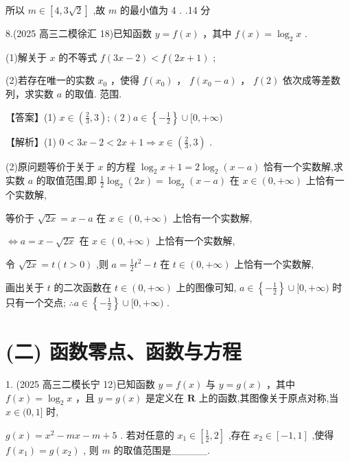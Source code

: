 \documentclass[10pt]{article}
\begin{document}
所以 \(m \in  \left\lbrack  {4,3\sqrt{2}}\right\rbrack\) ,故 \(m\) 的最小值为 4 . .14 分

8.(2025 高三二模徐汇 18)已知函数 \(y = f\left( x\right)\) ，其中 \(f\left( x\right)  = {\log }_{2}x\) .

(1)解关于 \(x\) 的不等式 \(f\left( {{3x} - 2}\right)  < f\left( {{2x} + 1}\right)\) ;

(2)若存在唯一的实数 \({x}_{0}\) ，使得 \(f\left( {x}_{0}\right)\) ， \(f\left( {{x}_{0} - a}\right)\) ， \(f\left( 2\right)\) 依次成等差数列，求实数 \(a\) 的取值. 范围.

【答案】(1) \(x \in  \left( {\frac{2}{3},3}\right) ;\left( 2\right) a \in  \left\{  {-\frac{1}{2}}\right\}   \cup  \lbrack 0, + \infty )\)

【解析】(1) \(0 < {3x} - 2 < {2x} + 1 \Rightarrow  x \in  \left( {\frac{2}{3},3}\right)\) .

(2)原问题等价于关于 \(x\) 的方程 \({\log }_{2}x + 1 = 2{\log }_{2}\left( {x - a}\right)\) 恰有一个实数解,求实数 \(a\) 的取值范围,即 \(\frac{1}{2}{\log }_{2}\left( {2x}\right)  = {\log }_{2}\left( {x - a}\right)\) 在 \(x \in  \left( {0, + \infty }\right)\) 上恰有一个实数解,

等价于 \(\sqrt{2x} = x - a\) 在 \(x \in  \left( {0, + \infty }\right)\) 上恰有一个实数解,

\(\Leftrightarrow  a = x - \sqrt{2x}\) 在 \(x \in  \left( {0, + \infty }\right)\) 上恰有一个实数解,

令 \(\sqrt{2x} = t\left( {t > 0}\right)\) ,则 \(a = \frac{1}{2}{t}^{2} - t\) 在 \(t \in  \left( {0, + \infty }\right)\) 上恰有一个实数解,

画出关于 \(t\) 的二次函数在 \(t \in  \left( {0, + \infty }\right)\) 上的图像可知, \(a \in  \left\{  {-\frac{1}{2}}\right\}   \cup  \lbrack 0, + \infty )\) 时只有一个交点; \(\therefore a \in  \left\{  {-\frac{1}{2}}\right\}   \cup  \lbrack 0, + \infty )\) .

\section*{(二) 函数零点、函数与方程}

1. (2025 高三二模长宁 12)已知函数 \(y = f\left( x\right)\) 与 \(y = g\left( x\right)\) ，其中 \(f\left( x\right)  = {\log }_{2}x\) ，且 \(y = g\left( x\right)\) 是定义在 \(\mathbf{R}\) 上的函数,其图像关于原点对称,当 \(x \in  (0,1\rbrack\) 时,

\(g\left( x\right)  = {x}^{2} - {mx} - m + 5\) . 若对任意的 \({x}_{1} \in  \left\lbrack  {\frac{1}{2},2}\right\rbrack\) ,存在 \({x}_{2} \in  \left\lbrack  {-1,1}\right\rbrack\) ,使得 \(f\left( {x}_{1}\right)  = g\left( {x}_{2}\right)\) , 则 \(m\) 的取值范围是\_\_\_\_\_.
\end{document}
